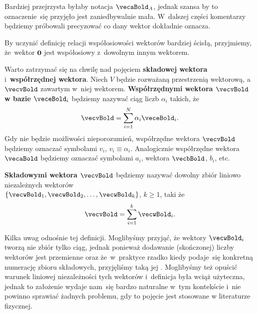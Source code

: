 \documentclass[a4paper,11pt]{article}
\numberwithin{equation}{section}
\begin{document}
Bardziej przejrzysta byłaby notacja $\vecaBold_{ A }$, jednak szansa by to
oznaczenie~się przyjęło jest zaniedbywalnie mała. W~dalszej części
komentarzy będziemy próbowali precyzować co dany wektor dokładnie oznacza.

\VerSpaceFour




\noindent
{} By uczynić definicję relacji współosiowości wektorów bardziej
ścisłą, przyjmiemy, że~wektor $\mathbf{0}$ jest współosiowy z~dowolnym
innym wektorem.

\VerSpaceFour





\noindent
{} Warto zatrzymać się na chwilę nad pojęciem \textbf{składowej
  wektora} i~\textbf{współrzędnej wektora}. Niech $V$ będzie rozważaną
przestrzenią wektorową, a~$\vecvBold$ zawartym w~niej wektorem.
\textbf{Współrzędnymi wektora $\vecvBold$ w bazie $\veceBold_{ i }$}
będziemy nazywać ciąg liczb $\alpha_{ i }$ takich, że
\begin{equation}
  \label{eq:SkalmierskiMechanika-01}
  \vecvBold = \sum_{ i = 1 }^{ N } \alpha_{ i } \veceBold_{ i }.
\end{equation}
Gdy nie będzie możliwości nieporozumień, współrzędne wektora $\vecvBold$
będziemy oznaczać symbolami $v_{ i }$, $v_{ i } \equiv \alpha_{ i }$. Analogicznie
współrzędne wektora $\vecaBold$ będziemy oznaczać symbolami $a_{ i }$,
wektora $\vecbBold$, $b_{ i }$, etc.

\textbf{Składowymi wektora $\vecvBold$} będziemy nazywać dowolny zbiór
liniowo niezależnych wektorów \\
$\{ \vecwBold_{ 1 }, \vecwBold_{ 2 }, \ldots, \vecwBold_{ k } \}$, $k \geq 1$, taki że
\begin{equation}
  \label{eq:SkalmierskiMechanika-02}
  \vecvBold = \sum_{ i = 1 }^{ k } \vecwBold_{ i }.
\end{equation}

Kilka uwag odnośnie tej definicji. Moglibyśmy przyjąć, że wektory
$\vecwBold_{ i }$ tworzą nie zbiór tylko ciąg, jednak ponieważ dodawanie
(skończonej) liczby wektorów jest przemienne oraz że~w~praktyce rzadko
kiedy podaje~się konkretną numerację zbioru składowych, przyjęliśmy taką
jej . Moglibyśmy też opuścić warunek liniowej niezależności tych
wektorów i~definicja była wciąż użyteczna, jednak to założenie wydaje
nam~się bardzo naturalne w~tym kontekście i~nie powinno sprawiać żadnych
problemu, gdy to pojęcie jest stosowane w literaturze fizycznej.
\end{document}
